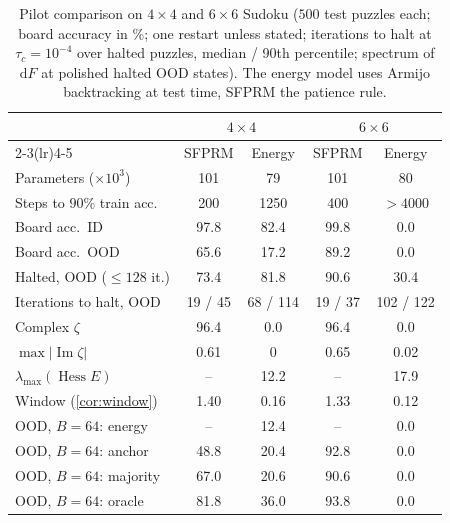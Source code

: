 \begin{table}[h]
  \caption{Pilot comparison on $4\times4$ and $6\times6$ Sudoku ($500$ test puzzles each; board
  accuracy in \%; one restart unless stated; iterations to halt at $\tau_c=10^{-4}$ over halted
  puzzles, median / 90th percentile; spectrum of $\mathrm dF$ at polished halted OOD states). The
  energy model uses Armijo backtracking at test time, SFPRM the patience rule.}
  \label{tab:pilot}
  \vskip 0.1in
  \begin{center}
  \begin{footnotesize}
  \setlength{\tabcolsep}{2.5pt}
  \begin{tabular}{@{}lcccc@{}}
    \toprule
     & \multicolumn{2}{c}{$4\times4$} & \multicolumn{2}{c}{$6\times6$} \\
    \cmidrule(lr){2-3}\cmidrule(lr){4-5}
     & SFPRM & Energy & SFPRM & Energy \\
    \midrule
    Parameters ($\times10^3$) & 101 & 79 & 101 & 80 \\
    Steps to $90\%$ train acc.\ & 200 & 1250 & 400 & $>4000$ \\
    Board acc.\ ID & 97.8 & 82.4 & 99.8 & 0.0 \\
    Board acc.\ OOD & 65.6 & 17.2 & 89.2 & 0.0 \\
    Halted, OOD ($\le128$ it.) & 73.4 & 81.8 & 90.6 & 30.4 \\
    Iterations to halt, OOD & 19 / 45 & 68 / 114 & 19 / 37 & 102 / 122 \\
    Complex $\zeta$ & 96.4 & 0.0 & 96.4 & 0.0 \\
    $\max|\operatorname{Im}\zeta|$ & 0.61 & $0$ & 0.65 & 0.02 \\
    $\lambda_{\max}(\operatorname{Hess}E)$ & -- & 12.2 & -- & 17.9 \\
    Window (\cref{cor:window}) & 1.40 & 0.16 & 1.33 & 0.12 \\
    OOD, $B{=}64$: energy & -- & 12.4 & -- & 0.0 \\
    OOD, $B{=}64$: anchor & 48.8 & 20.4 & 92.8 & 0.0 \\
    OOD, $B{=}64$: majority & 67.0 & 20.6 & 90.6 & 0.0 \\
    OOD, $B{=}64$: oracle & 81.8 & 36.0 & 93.8 & 0.0 \\
    \bottomrule
  \end{tabular}
  \end{footnotesize}
  \end{center}
  \vskip -0.1in
\end{table}

